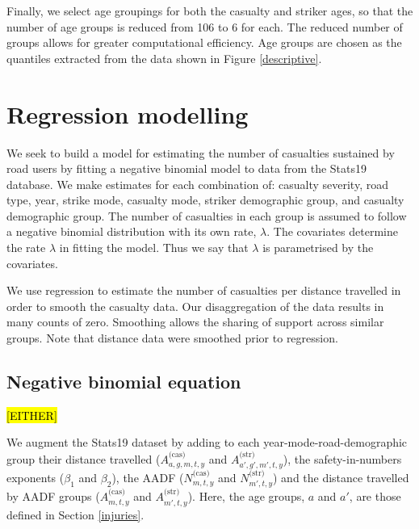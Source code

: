 \documentclass{article}
\begin{document}
Finally, we select age groupings for both the casualty and striker ages, so that the number of age groups is reduced from 106 to 6 for each. The reduced number of groups allows for greater computational efficiency. Age groups are chosen as the quantiles extracted from the data shown in Figure \ref{descriptive}.


\section{Regression modelling}\label{regression}

We seek to build a model for estimating the number of casualties sustained by road users by fitting a negative binomial model to data from the Stats19 database. We make estimates for each combination of: casualty severity, road type, year, strike mode, casualty mode, striker demographic group, and casualty demographic group. The number of casualties in each group is assumed to follow a negative binomial distribution with its own rate, $\lambda$. The covariates determine the rate $\lambda$ in fitting the model. Thus we say that $\lambda$ is parametrised by the covariates.

We use regression to estimate the number of casualties per distance travelled in order to smooth the casualty data. Our disaggregation of the data results in many counts of zero. Smoothing allows the sharing of support across similar groups. Note that distance data were smoothed prior to regression.

\subsection{Negative binomial equation}

\hl{[EITHER]}

We augment the Stats19 dataset by adding to each year-mode-road-demographic group their distance travelled ($A_{a,g,m,t,y}^{\text{(cas)}}$ and $A_{a',g',m',t,y}^{\text{(str)}}$), the safety-in-numbers exponents ($\beta_1$ and $\beta_2$), the AADF ($N_{m,t,y}^{\text{(cas)}}$ and $N_{m',t,y}^{\text{(str)}}$) and the distance travelled by AADF groups ($A_{m,t,y}^{\text{(cas)}}$ and $A_{m',t,y}^{\text{(str)}}$). Here, the age groups, $a$ and $a'$, are those defined in Section \ref{injuries}.
\end{document}
